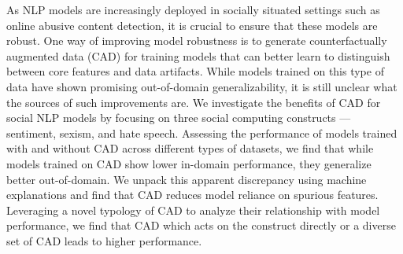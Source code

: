 As NLP models are increasingly deployed in socially situated settings such as online abusive content detection, it is crucial to ensure that these models are robust. One way of improving model robustness is to generate counterfactually augmented data (CAD) for training models that can better learn to distinguish between core features and data artifacts. While models trained on this type of data have shown promising out-of-domain generalizability, it is still unclear what the sources of such improvements are. We investigate the benefits of CAD for social NLP models by focusing on three social computing constructs --- sentiment, sexism, and hate speech. Assessing the performance of models trained with and without CAD across different types of datasets, we find that while models trained on CAD show lower in-domain performance, they generalize better out-of-domain. We unpack this apparent discrepancy using machine explanations and find that CAD reduces model reliance on spurious features. Leveraging a novel typology of CAD to analyze their relationship with model performance, we find that CAD which acts on the construct directly or a diverse set of CAD leads to higher performance.
